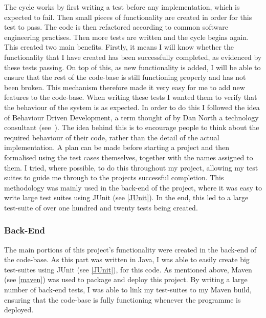 The cycle works by first writing a test before any implementation, which is expected to fail. Then small pieces of functionality are created in order for this test to pass. The code is then refactored according to common software engineering practises. Then more tests are written and the cycle begins again. This created two main benefits. Firstly, it means I will know whether the functionality that I have created has been successfully completed, as evidenced by these tests passing. On top of this, as new functionality is added, I will be able to ensure that the rest of the code-base is still functioning properly and has not been broken. This mechanism therefore made it very easy for me to add new features to the code-base. When writing these tests I wanted them to verify that the behaviour of the system is as expected. In order to do this I followed the idea of Behaviour Driven Development, a term thought of by Dan North a technology consultant (see~\cite{danNorth}). The idea behind this is to encourage people to think about the required behaviour of their code, rather than the detail of the actual implementation. A plan can be made before starting a project and then formalised using the test cases themselves, together with the names assigned to them. I tried, where possible, to do this throughout my project, allowing my test suites to guide me through to the projects successful completion. This methodology was mainly used in the back-end of the project, where it was easy to write large test suites using JUnit (see \ref{JUnit}). In the end, this led to a large test-suite of over one hundred and twenty tests being created. 

\subsubsection{Back-End}
The main portions of this project's functionality were created in the back-end of the code-base. As this part was written in Java, I was able to easily create big test-suites using JUnit (see \ref{JUnit}), for this code. As mentioned above, Maven (see \ref{maven}) was used to package and deploy this project. By writing a large number of back-end tests, I was able to link my test-suites to my Maven build, ensuring that the code-base is fully functioning whenever the programme is deployed.

